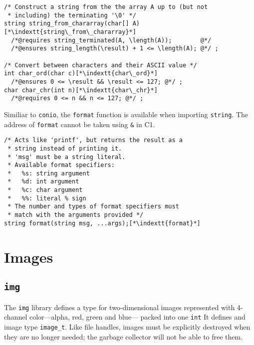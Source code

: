 \documentclass[11pt]{article}
\makeatletter
\newcommand{\indextt}[1]{\index{#1@\texttt{#1}}}
\makeatother
\begin{document}
\begin{lstlisting}
/* Construct a string from the the array A up to (but not
 * including) the terminating '\0' */
string string_from_chararray(char[] A)[*\indextt{string\_from\_chararray}*]
  /*@requires string_terminated(A, \length(A));        @*/
  /*@ensures string_length(\result) + 1 <= \length(A); @*/ ;

/* Convert between characters and their ASCII value */
int char_ord(char c)[*\indextt{char\_ord}*]
  /*@ensures 0 <= \result && \result <= 127; @*/ ;
char char_chr(int n)[*\indextt{char\_chr}*]
  /*@requires 0 <= n && n <= 127; @*/ ;
\end{lstlisting}

Similiar to \lstinline'conio', the \lstinline'format' function
is available when importing \lstinline'string'.
The address of \lstinline'format' cannot be taken using \lstinline'&' in C1.
\begin{lstlisting}
/* Acts like 'printf', but returns the result as a
 * string instead of printing it.
 * 'msg' must be a string literal.
 * Available format specifiers:
 *   %s: string argument
 *   %d: int argument
 *   %c: char argument
 *   %%: literal % sign
 * The number and types of format specifiers must
 * match with the arguments provided */
string format(string msg, ...args);[*\indextt{format}*]
\end{lstlisting}

\clearpage

\section{Images}

\subsection{\tt img}

The \lstinline'img' library defines a type for two-dimensional images
represented with 4-channel color---alpha, red, green and blue---
packed into one \lstinline'int'  It defines and image type \lstinline'image_t'.
Like file handles, images must be explicitly destroyed when they
are no longer needed; the garbage collector will not be able to
free them.
\end{document}

